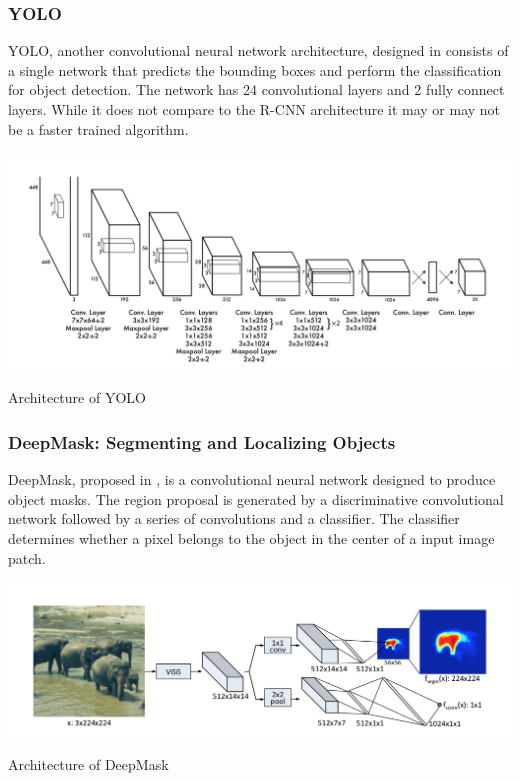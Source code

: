 \subsubsection{YOLO}
YOLO, another convolutional neural network architecture, designed in \cite{DBLP:journals/corr/RedmonDGF15} consists of a single network that predicts the bounding boxes and perform the classification for object detection. 
The network has 24 convolutional layers and 2 fully connect layers.  
While it does not compare to the R-CNN architecture it may or may not be a faster trained algorithm.

\begin{table}[h!]
  \includegraphics[width=\textwidth]{lectures/04-b/yolo.png}
  \caption{Architecture of YOLO}
  \label{fig:yolo}
\end{table}


\subsubsection{DeepMask: Segmenting and Localizing Objects}
DeepMask, proposed in \cite{DBLP:journals/corr/PinheiroCD15}, is a convolutional neural network designed to produce object masks.
The region proposal is generated by a discriminative convolutional network followed by a series of convolutions and a classifier.
The classifier determines whether a pixel belongs to the object in the center of a input image patch.

\begin{table}[h!]
  \includegraphics[width=\textwidth]{lectures/04-b/deepmsk.png}
  \caption{Architecture of DeepMask}
  \label{fig:deepmsk}
\end{table}


